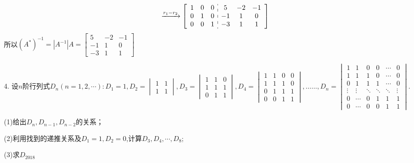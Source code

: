 \documentclass{article}
\begin{document}
\begin{jie}
\begin{align*}
{}
\xrightarrow{r_{1}-r_{2}}
{
\left[
\begin{array}{c:c}
\begin{matrix}
1 & 0 & 0 \\
  0 & 1 & 0 \\
  0 & 0 & 1
\end{matrix}&
\begin{matrix}
5 & -2 & -1 \\
  -1 & 1 & 0 \\
  -3 & 1 & 1
\end{matrix}
\end{array}
\right]
}
\end{align*}
所以$(A^{*})^{-1}=|A^{-1}|A=
\begin{bmatrix}
  5 & -2 & -1\\
  -1 & 1 & 0\\
  -3 & 1 & 1
\end{bmatrix}
$
\end{jie}

4. 设$n$阶行列式$D_{n}(n=1,2,\cdots):D_{1}=1,D_{2}=
\begin{vmatrix}
  1 & 1 \\
  1 & 1
\end{vmatrix},D_{3}=
\begin{vmatrix}
  1 & 1 & 0\\
  1 & 1 & 1\\
  0 & 1 & 1
\end{vmatrix},D_{4}=
\begin{vmatrix}
  1 & 1 & 0 & 0\\
  1 & 1 & 1 & 0\\
  0 & 1 & 1 & 1\\
  0 & 0 & 1 & 1
\end{vmatrix},\ldots\ldots,D_{n}=
\begin{vmatrix}
  1 & 1 & 0 & 0 & \cdots & 0\\
  1 & 1 & 1 & 0 & \cdots & 0\\
  0 & 1 & 1 & 1 & \cdots & 0\\
  \vdots & \vdots &\ddots & \ddots &\ddots &\vdots\\
  0 &\cdots & 0 & 1 & 1& 1\\
  0 &\cdots & 0 & 0 & 1& 1
\end{vmatrix}.
$

(1)给出$D_{n},D_{n-1},D_{n-2}$的关系；

(2)利用找到的递推关系及$D_{1}=1,D_{2}=0$,计算$D_{3},D_{4},\cdots,D_{8}$;

(3)求$D_{2018}$
\end{document}
